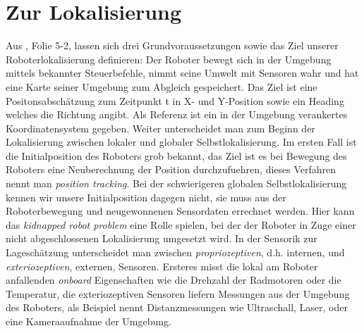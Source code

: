 \documentclass[11pt,a4paper]{article}
\begin{document}
\section{Zur Lokalisierung}
Aus \cite{website:lokalisierung}, Folie 5-2, lassen sich drei Grundvoraussetzungen sowie das Ziel unserer Roboterlokalisierung definieren: Der Roboter bewegt sich in der Umgebung mittels bekannter Steuerbefehle,
nimmt seine Umwelt mit Sensoren wahr und hat eine Karte seiner Umgebung zum Abgleich gespeichert. Das Ziel ist eine Positonsabschätzung zum Zeitpunkt t in X- und Y-Position sowie ein Heading welches
die Richtung angibt. Als Referenz ist ein in der Umgebung verankertes Koordinatensystem gegeben. Weiter unterscheidet man zum Beginn der Lokalisierung zwischen lokaler und globaler
Selbstlokalisierung. Im ersten Fall ist die Initialposition des Roboters grob bekannt, das Ziel ist es bei Bewegung des Roboters eine Neuberechnung der Position durchzufuehren,
dieses Verfahren nennt man \textit{position tracking}. Bei der schwierigeren globalen Selbstlokalisierung kennen wir unsere Initialposition dagegen nicht, sie muss aus der 
Roboterbewegung und neugewonnenen Sensordaten errechnet werden. Hier kann das \textit{kidnapped robot problem} eine Rolle spielen, bei der der Roboter in Zuge einer nicht abgeschlossenen Lokalisierung
umgesetzt wird.
In der Sensorik zur Lageschätzung unterscheidet man zwischen \textit{propriozeptiven}, d.h. internen, und \textit{exteriozeptiven}, externen, Sensoren. 
Ersteres misst die lokal am Roboter anfallenden \textit{onboard} \cite{website:robotik} Eigenschaften wie die Drehzahl der Radmotoren oder die Temperatur, die 
exteriozeptiven Sensoren liefern Messungen aus der Umgebung des Roboters, als Beispiel nennt \cite{website:robotik} Distanzmessungen wie Ultraschall, Laser, oder eine Kameraaufnahme der Umgebung.
\end{document}
